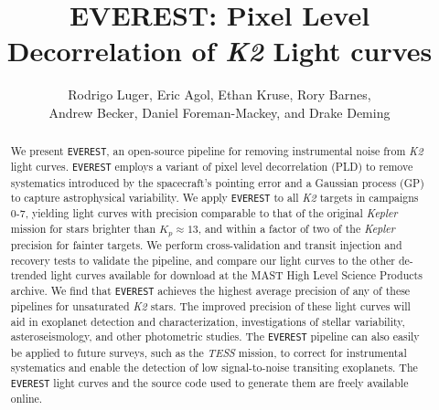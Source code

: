 \documentclass[]{emulateapj}
\begin{document}
\title{EVEREST: Pixel Level Decorrelation of \emph{K2} Light curves}

\author{Rodrigo Luger, Eric Agol, Ethan Kruse, Rory Barnes,\\
Andrew Becker, Daniel Foreman-Mackey, and Drake Deming}
\begin{abstract}
We present \texttt{EVEREST}, an open-source pipeline for removing instrumental noise
from \emph{K2} light curves. \texttt{EVEREST} employs a variant of pixel level decorrelation (PLD) 
to remove systematics introduced by the spacecraft's 
pointing error and a Gaussian process (GP) to capture astrophysical variability. We
apply \texttt{EVEREST} to all \emph{K2} targets in campaigns 0-7, yielding light curves
with precision comparable to that of the original \emph{Kepler} mission for stars brighter
than $K_p \approx 13$, and within a factor of two of the \emph{Kepler} precision for fainter
targets. We perform cross-validation and transit injection and recovery tests to validate
the pipeline, and compare our light curves to the other de-trended light curves available
for download at the MAST High Level Science Products archive. We find that 
\texttt{EVEREST} achieves the highest average precision of any of these pipelines for 
unsaturated \emph{K2} stars. The improved precision of these
light curves will aid in exoplanet detection and characterization, investigations of stellar
variability, asteroseismology, and other photometric studies. The \texttt{EVEREST} pipeline can
also easily be applied to future surveys, such as the \emph{TESS} mission, to
correct for instrumental systematics and enable the detection of low signal-to-noise transiting
exoplanets. The \texttt{EVEREST} light curves and the source code
used to generate them are freely available online.
\end{abstract}
\end{document}
